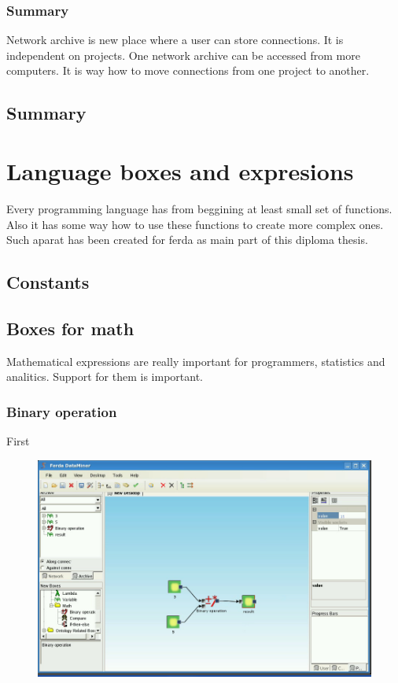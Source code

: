 \documentclass{article}
\begin{document}
\subsubsection{Summary}
Network archive is new place where a user can store connections. It is independent on projects. One network archive can be accessed from more computers. It is way how to move connections from one project to another.


\subsection{Summary}

\section{Language boxes and expresions}
Every programming language has from beggining at least small set of functions. Also it has some way how to use these functions to create more complex ones. Such aparat has been created for ferda as main part of this diploma thesis.

\subsection{Constants}

\subsection{Boxes for math}
Mathematical expressions are really important for programmers, statistics and analitics. Support for them is important. 

\subsubsection{Binary operation}
First 
\begin{figure}
	\includegraphics[width=12cm]{binaryOperation2.png}
	\caption{}
\end{figure}
\end{document}
